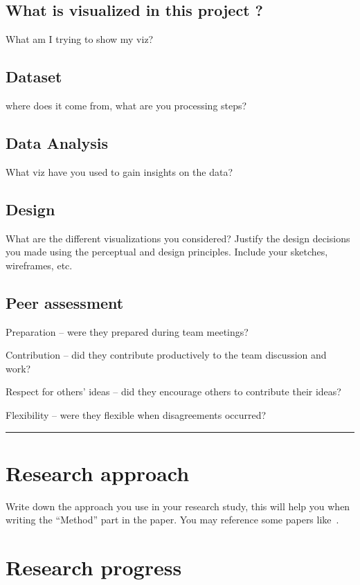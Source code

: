 \documentclass[a4paper]{article}
\begin{document}
\subsection{What is visualized in this project ?}
What am I trying to show my viz?

\subsection{Dataset}
where does it come from, what are you processing steps?

\subsection{Data Analysis}
What viz have you used to gain insights on the data?

\subsection{Design}
What are the different visualizations you considered? Justify the design decisions you made using the perceptual and design principles.
Include your sketches, wireframes, etc.

\subsection{Peer assessment}

Preparation – were they prepared during team meetings?

Contribution – did they contribute productively to the team discussion and work?

Respect for others’ ideas – did they encourage others to contribute their ideas?

Flexibility – were they flexible when disagreements occurred?
\vspace{2cm}
\hrule

\section{Research approach}

Write down the approach you use in your research study, this will help you when writing the ``Method'' part in the paper. You may reference some papers like~\cite{isola2017image}.


\section{Research progress}
\end{document}
